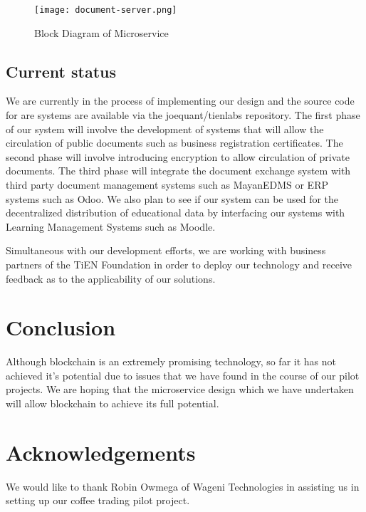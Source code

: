 \documentclass[journal]{IEEEtran}
\begin{document}
\begin{comment}
@startuml

package "Docker Image" {
  [GraphJS API]
  [Git Repository]
  [Mango Interface]
}

cloud {
  [Ethereum Blockchain]
}

cloud {
  [IPFS Data Store]
}

[Document] --> [GraphJS API]
[GraphJS API] --> [Git Repository]
[Git Repository] --> [Mango Interface]
[Mango Interface] --> [Ethereum Blockchain]
[Mango Interface] --> [IPFS Data Store]

@enduml
\end{comment}
\begin{figure}
  \texttt{[image: document-server.png]}
  \caption{Block Diagram of Microservice}
\end{figure}

\subsection{Current status}

We are currently in the process of implementing our design and the
source code for are systems are available via the joequant/tienlabs
repository.  The first phase of our system will involve the
development of systems that will allow the circulation of public
documents such as business registration certificates.  The second
phase will involve introducing encryption to allow circulation of
private documents.  The third phase will integrate the document
exchange system with third party document management systems such as
MayanEDMS or ERP systems such as Odoo.  We also plan to see if our
system can be used for the decentralized distribution of educational
data by interfacing our systems with Learning Management Systems such
as Moodle.

Simultaneous with our development efforts, we are working with
business partners of the TiEN Foundation in order to deploy our
technology and receive feedback as to the applicability of our
solutions.

\section{Conclusion}
Although blockchain is an extremely promising technology, so far it
has not achieved it's potential due to issues that we have found in
the course of our pilot projects.  We are hoping that the microservice
design which we have undertaken will allow blockchain to achieve its
full potential.

\section{Acknowledgements}
We would like to thank Robin Owmega of Wageni Technologies in
assisting us in setting up our coffee trading pilot project.

\printbibliography
\end{document}
